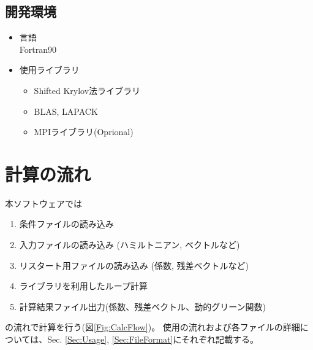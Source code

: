 \documentclass[12pt,titlepage]{jarticle}
\begin{document}
\subsection{開発環境}

\begin{itemize}
\item{言語}\\
 Fortran90

 \item{使用ライブラリ}
   \begin{itemize}
   \item{Shifted Krylov法ライブラリ}
   \item{BLAS, LAPACK}
   \item{MPIライブラリ(Oprional)}
   \end{itemize}

\end{itemize}

\newpage
\section{計算の流れ}
本ソフトウェアでは
\begin{enumerate}
\item{条件ファイルの読み込み}
\item{入力ファイルの読み込み (ハミルトニアン, ベクトルなど)}
\item{リスタート用ファイルの読み込み (係数, 残差ベクトルなど)}
\item{ライブラリを利用したループ計算}
\item{計算結果ファイル出力(係数、残差ベクトル、動的グリーン関数)}
\end{enumerate}
の流れで計算を行う(図\ref{Fig:CalcFlow})。
使用の流れおよび各ファイルの詳細については、Sec. \ref{Sec:Usage}, \ref{Sec:FileFormat}にそれぞれ記載する。
\end{document}
